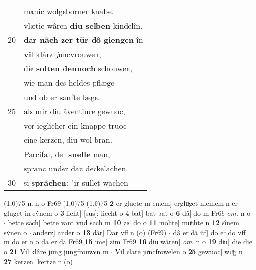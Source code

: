 \documentclass[8pt,a4paper,notitlepage]{article}
\begin{document}
\begin{table}[ht]
\begin{minipage}[t]{0.5\linewidth}
\begin{tabular}{rl}
 & manic wolgeborner knabe.\\ 
 & vlætic wâren \textbf{diu selben} kindelîn.\\ 
20 & \textbf{dar nâch zer tür dô giengen} în\\ 
 & \textbf{vil} klâr\textit{e} \textit{j}uncvrouwen,\\ 
 & die \textbf{solten dennoch} schouwen,\\ 
 & wie man des heldes pflæge\\ 
 & und ob er sanfte læge.\\ 
25 & als mir diu âventiure gewuoc,\\ 
 & vor ieglîcher ein knappe truoc\\ 
 & eine kerzen, diu wol bran.\\ 
 & Parcifal, der \textbf{snelle} man,\\ 
 & spranc under daz deckelachen.\\ 
30 & si \textbf{sprâchen}: "ir sullet wachen\\ 
\end{tabular}
\scriptsize
\line(1,0){75} \newline
m n o Fr69 \newline
\line(1,0){75} \newline
\newline
\line(1,0){75} \newline
\textbf{2} er glüete in einem] ergluͯget niemem n er gluget in eẏnem o \textbf{3} lieht] [sus]: liecht o \textbf{4} bat] bat bat o \textbf{6} dâ] do m Fr69 \textit{om.} n o  $\cdot$ bette sach] bette vant vnd sach m \textbf{10} ze] do o \textbf{11} mohte] moͯchte n \textbf{12} sînem] sẏnen o  $\cdot$ anderz] ander o \textbf{13} dâr] Dar vff n (o) (Fr69)  $\cdot$ dâ er dâ ûf] do er do vff m do er n o da er da Fr69 \textbf{15} ime] zim Fr69 \textbf{16} diu wâren] \textit{om.} n o \textbf{19} diu] die die o \textbf{21} Vil klâre jung jungfrouwen m  $\cdot$ Vil clare juͯncfrowelen o \textbf{25} gewuoc] wuͦg n \textbf{27} kerzen] kertze n (o) \newline
\end{minipage}
\end{table}
\newpage
\end{document}
